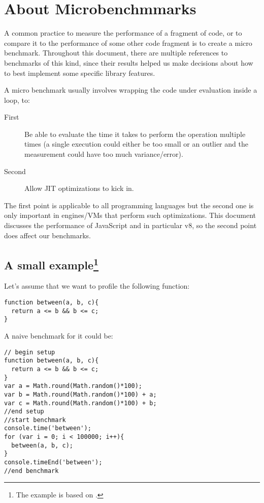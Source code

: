 \section{About Microbenchmmarks}
A common practice to measure the performance of a fragment of code, or to compare it to the performance of some other code fragment is to create a micro benchmark. Throughout this document, there are multiple references to benchmarks of this kind, since their results helped us make decisions about how to best implement some specific library features.

A micro benchmark usually involves wrapping the code under evaluation inside a loop, to:

\begin{description}
\item[First] Be able to evaluate the time it takes to perform the operation multiple times (a single execution could either be too small or an outlier and the measurement could have too much variance/error).
\item[Second] Allow JIT optimizations to kick in.
\end{description}

The first point is applicable to all programming languages but the second one is only important in engines/VMs that perform such optimizations. This document discusses the performance of JavaScript and in particular v8, so the second point does affect our benchmarks.

\subsection{A small example\protect\footnote{The example is based on \cite{mraleph-bc}.}}
Let's assume that we want to profile the following function:
\begin{lstlisting}[caption=Function to benchmark]
function between(a, b, c){
  return a <= b && b <= c;
}
\end{lstlisting}

A naive benchmark for it could be:
\begin{lstlisting}[caption=Naive benchmark]
// begin setup
function between(a, b, c){
  return a <= b && b <= c;
}
var a = Math.round(Math.random()*100);
var b = Math.round(Math.random()*100) + a;
var c = Math.round(Math.random()*100) + b;
//end setup
//start benchmark
console.time('between');
for (var i = 0; i < 100000; i++){
  between(a, b, c);
}
console.timeEnd('between');
//end benchmark
\end{lstlisting}

